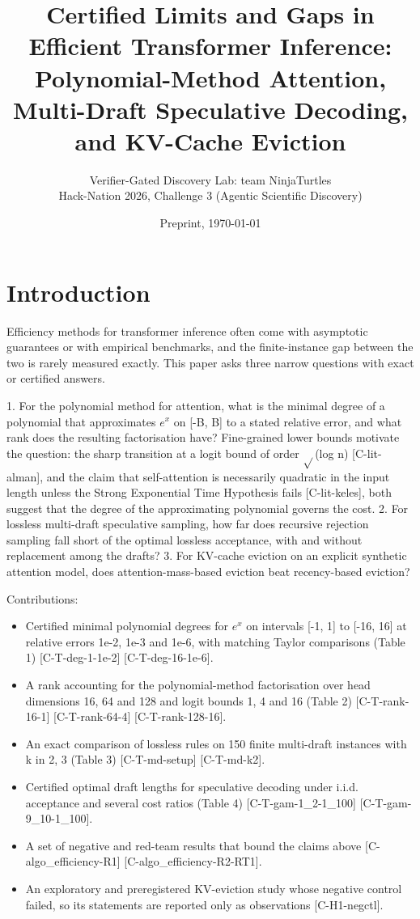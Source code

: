 \documentclass[10pt,twocolumn]{article}
\title{\textbf{Certified Limits and Gaps in Efficient Transformer Inference: Polynomial-Method Attention, Multi-Draft Speculative Decoding, and KV-Cache Eviction}}
\author{Verifier-Gated Discovery Lab: team NinjaTurtles\\ \small Hack-Nation 2026, Challenge 3 (Agentic Scientific Discovery)}
\date{Preprint, \today}
\begin{document}
\maketitle
\section{Introduction}

Efficiency methods for transformer inference often come with asymptotic guarantees or with empirical benchmarks, and the finite-instance gap between the two is rarely measured exactly. This paper asks three narrow questions with exact or certified answers.

1. For the polynomial method for attention, what is the minimal degree of a polynomial that approximates $e^x$ on [-B, B] to a stated relative error, and what rank does the resulting factorisation have? Fine-grained lower bounds motivate the question: the sharp transition at a logit bound of order $\sqrt{}$(log n) {\scriptsize[C-lit-alman]}, and the claim that self-attention is necessarily quadratic in the input length unless the Strong Exponential Time Hypothesis fails {\scriptsize[C-lit-keles]}, both suggest that the degree of the approximating polynomial governs the cost.
2. For lossless multi-draft speculative sampling, how far does recursive rejection sampling fall short of the optimal lossless acceptance, with and without replacement among the drafts?
3. For KV-cache eviction on an explicit synthetic attention model, does attention-mass-based eviction beat recency-based eviction?

Contributions:

\begin{itemize}
\item Certified minimal polynomial degrees for $e^x$ on intervals [-1, 1] to [-16, 16] at relative errors 1e-2, 1e-3 and 1e-6, with matching Taylor comparisons (Table 1) {\scriptsize[C-T-deg-1-1e-2]} {\scriptsize[C-T-deg-16-1e-6]}.
\item A rank accounting for the polynomial-method factorisation over head dimensions 16, 64 and 128 and logit bounds 1, 4 and 16 (Table 2) {\scriptsize[C-T-rank-16-1]} {\scriptsize[C-T-rank-64-4]} {\scriptsize[C-T-rank-128-16]}.
\item An exact comparison of lossless rules on 150 finite multi-draft instances with k in {2, 3} (Table 3) {\scriptsize[C-T-md-setup]} {\scriptsize[C-T-md-k2]}.
\item Certified optimal draft lengths for speculative decoding under i.i.d. acceptance and several cost ratios (Table 4) {\scriptsize[C-T-gam-1\_2-1\_100]} {\scriptsize[C-T-gam-9\_10-1\_100]}.
\item A set of negative and red-team results that bound the claims above {\scriptsize[C-algo\_efficiency-R1]} {\scriptsize[C-algo\_efficiency-R2-RT1]}.
\item An exploratory and preregistered KV-eviction study whose negative control failed, so its statements are reported only as observations {\scriptsize[C-H1-negctl]}.
\end{itemize}
\end{document}
